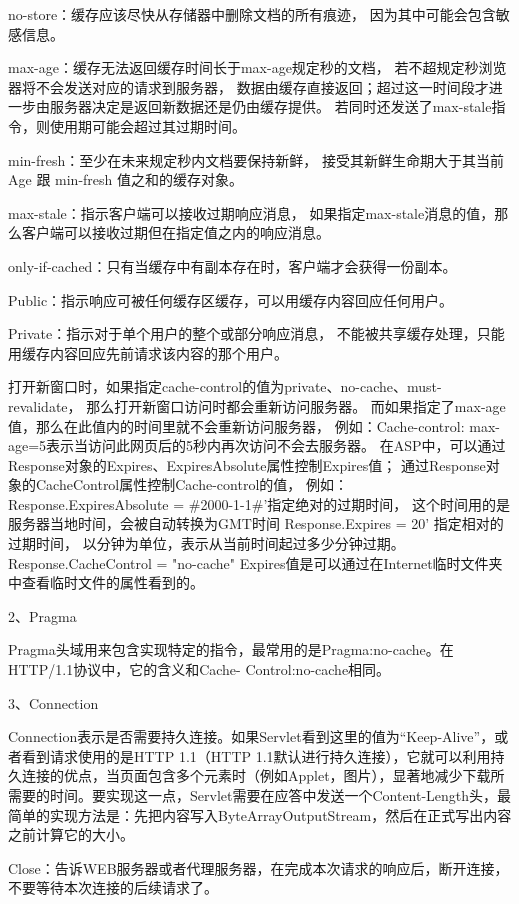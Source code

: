 \documentclass{book}
\begin{document}
no-store：缓存应该尽快从存储器中删除文档的所有痕迹，
因为其中可能会包含敏感信息。

max-age：缓存无法返回缓存时间长于max-age规定秒的文档，
若不超规定秒浏览器将不会发送对应的请求到服务器，
数据由缓存直接返回；超过这一时间段才进一步由服务器决定是返回新数据还是仍由缓存提供。
若同时还发送了max-stale指令，则使用期可能会超过其过期时间。

min-fresh：至少在未来规定秒内文档要保持新鲜，
接受其新鲜生命期大于其当前 Age 跟 min-fresh 值之和的缓存对象。

max-stale：指示客户端可以接收过期响应消息，
如果指定max-stale消息的值，那么客户端可以接收过期但在指定值之内的响应消息。

only-if-cached：只有当缓存中有副本存在时，客户端才会获得一份副本。

Public：指示响应可被任何缓存区缓存，可以用缓存内容回应任何用户。

Private：指示对于单个用户的整个或部分响应消息，
不能被共享缓存处理，只能用缓存内容回应先前请求该内容的那个用户。

打开新窗口时，如果指定cache-control的值为private、no-cache、must-revalidate，
那么打开新窗口访问时都会重新访问服务器。
而如果指定了max-age值，那么在此值内的时间里就不会重新访问服务器，
例如：Cache-control: max-age=5表示当访问此网页后的5秒内再次访问不会去服务器。
在ASP中，可以通过Response对象的Expires、ExpiresAbsolute属性控制Expires值；
通过Response对象的CacheControl属性控制Cache-control的值，
例如：
Response.ExpiresAbsolute = \#2000-1-1\#'指定绝对的过期时间，
这个时间用的是服务器当地时间，会被自动转换为GMT时间
Response.Expires = 20' 指定相对的过期时间，
以分钟为单位，表示从当前时间起过多少分钟过期。
Response.CacheControl = "no-cache"
Expires值是可以通过在Internet临时文件夹中查看临时文件的属性看到的。

2、Pragma

Pragma头域用来包含实现特定的指令，最常用的是Pragma:no-cache。在HTTP/1.1协议中，它的含义和Cache- Control:no-cache相同。

3、Connection

Connection表示是否需要持久连接。如果Servlet看到这里的值为“Keep-Alive”，或者看到请求使用的是HTTP 1.1（HTTP 1.1默认进行持久连接），它就可以利用持久连接的优点，当页面包含多个元素时（例如Applet，图片），显著地减少下载所需要的时间。要实现这一点，Servlet需要在应答中发送一个Content-Length头，最简单的实现方法是：先把内容写入ByteArrayOutputStream，然后在正式写出内容之前计算它的大小。

Close：告诉WEB服务器或者代理服务器，在完成本次请求的响应后，断开连接，不要等待本次连接的后续请求了。
\end{document}
